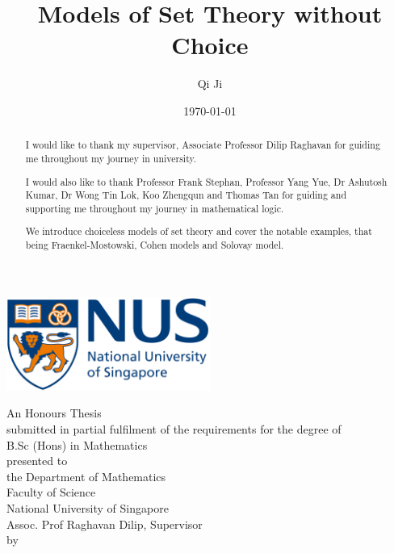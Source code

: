 \documentclass[british,a4paper,12pt,abstract=on]{scrreprt}
\title{Models of Set Theory without Choice}
\author{Qi Ji}
\date{\today}
\makeatletter
\let\thetitle\@title
\let\theauthor\@author
\let\thedate\@date
\theoremstyle{definition}
\theoremstyle{remark}
\newcommand{\makecoverpage}{
    \begin{center}
        \includegraphics[width=0.5\textwidth]{nus_logo}
        \vspace*{3em}

        \begin{doublespace}
        {\huge \textbf{\thetitle}}
        \vspace*{5em}

        {An Honours Thesis \\ submitted in partial fulfilment of the requirements for
        the degree of \\ B.Sc (Hons) in Mathematics\\}
        \vspace*{3em}
        {presented to \\ the Department of Mathematics \\ Faculty of Science \\ National University of Singapore \\ Assoc. Prof Raghavan Dilip, Supervisor \\}
        \vspace*{3em}
        {by \\ \theauthor \\}
        \vspace*{3em}
        {\thedate}
        \end{doublespace}
    \end{center}
}
\newenvironment*{acknowledgements}{\renewcommand\abstractname{Acknowledgements}\begin{abstract}} {\end{abstract}}
\makeatother
\begin{document}
\let\setminus\smallsetminus
\let\epsilon\varepsilon
\let\phi\varphi
\begin{titlepage}
    \makecoverpage
\end{titlepage}
{}
\begin{acknowledgements}
    I would like to thank my supervisor, Associate Professor Dilip Raghavan for guiding me throughout my journey in university.

    I would also like to thank Professor Frank Stephan, Professor Yang Yue, Dr Ashutosh Kumar, Dr Wong Tin Lok, Koo Zhengqun and Thomas Tan for guiding and supporting me throughout my journey in mathematical logic.
\end{acknowledgements}

{}
\begin{abstract}
    We introduce choiceless models of set theory and cover the notable examples,
    that being Fraenkel-Mostowski, Cohen models and Solovay model.


\end{abstract}

\tableofcontents






\begin{onehalfspace}
    \printbibliography[heading=bibintoc,title={References}]
\end{onehalfspace}
\end{document}
